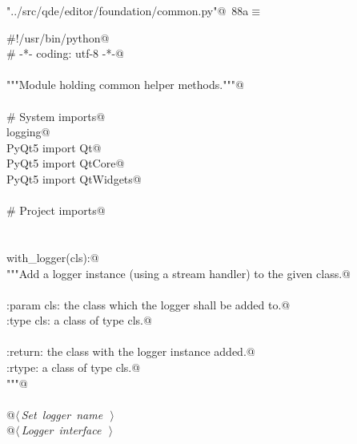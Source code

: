\documentclass[
    a4paper,      %
    10pt,         %
    openright,    %
    notitlepage,  %
    parskip=half, %
]{scrreprt}       %
\theoremstyle{definition}                    %
\begin{document}
\begin{flushleft} \small
\begin{minipage}{\linewidth}\label{scrap143}\raggedright\small
{} \verb@"../src/qde/editor/foundation/common.py"@\nobreak\ {\footnotesize {88a}}$\equiv$
\vspace{-1ex}
\begin{list}{}{} \item
\mbox{}\lstinline@#!/usr/bin/python@\\
\mbox{}\lstinline@# -*- coding: utf-8 -*-@\\
\mbox{}\lstinline@@\\
\mbox{}\lstinline@"""Module holding common helper methods."""@\\
\mbox{}\lstinline@@\\
\mbox{}\lstinline@# System imports@\\
\mbox{}\lstinline@import logging@\\
\mbox{}\lstinline@from PyQt5 import Qt@\\
\mbox{}\lstinline@from PyQt5 import QtCore@\\
\mbox{}\lstinline@from PyQt5 import QtWidgets@\\
\mbox{}\lstinline@@\\
\mbox{}\lstinline@# Project imports@\\
\mbox{}\lstinline@@\\
\mbox{}\lstinline@@\\
\mbox{}\lstinline@def with_logger(cls):@\\
\mbox{}\lstinline@    """Add a logger instance (using a stream handler) to the given class.@\\
\mbox{}\lstinline@@\\
\mbox{}\lstinline@    :param cls: the class which the logger shall be added to.@\\
\mbox{}\lstinline@    :type  cls: a class of type cls.@\\
\mbox{}\lstinline@@\\
\mbox{}\lstinline@    :return: the class with the logger instance added.@\\
\mbox{}\lstinline@    :rtype:  a class of type cls.@\\
\mbox{}\lstinline@    """@\\
\mbox{}\lstinline@@\\
\mbox{}\lstinline@    @\hbox{$\langle\,${\itshape Set logger name}\nobreak\ {\footnotesize {}}$\,\rangle$}\lstinline@@\\
\mbox{}\lstinline@    @\hbox{$\langle\,${\itshape Logger interface}\nobreak\ {\footnotesize {}}$\,\rangle$}\lstinline@@\\
\mbox{}\lstinline@@{\NWsep}
\end{list}
\vspace{-1.5ex}
\footnotesize
\begin{list}{}{\setlength{\itemsep}{-\parsep}\setlength{\itemindent}{-\leftmargin}}

\item{}
\end{list}
\end{minipage}\vspace{4ex}
\end{flushleft}
\end{document}
